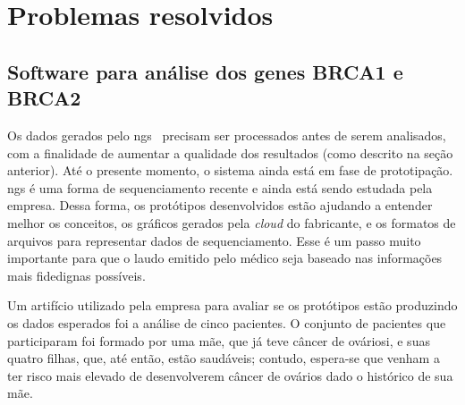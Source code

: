 
%
%


\section{Problemas resolvidos}

\subsection{Software para análise dos genes BRCA1 e BRCA2}

Os dados gerados pelo \gls{ngs}~\cite{SamTools} precisam ser processados antes de serem analisados, com a finalidade de aumentar a qualidade
dos resultados (como descrito na seção anterior).
Até o presente momento, o sistema ainda está em fase de prototipação. \gls{ngs} é uma forma de sequenciamento
recente e ainda está sendo estudada pela empresa. Dessa forma, os protótipos desenvolvidos estão ajudando a entender melhor os conceitos, os gráficos
gerados pela \textit{cloud} do fabricante, e os formatos de arquivos para representar dados de sequenciamento. Esse é um passo muito importante para que
o laudo emitido pelo médico seja baseado nas informações mais fidedignas possíveis.

Um artifício utilizado pela empresa para avaliar se os protótipos estão produzindo os dados esperados foi a análise de cinco pacientes.
O conjunto de pacientes que participaram foi formado por uma mãe, que já teve câncer de ováriosi, e suas quatro filhas, que, até então, estão saudáveis;
contudo, espera-se que venham a ter risco mais elevado de desenvolverem câncer de ovários dado o histórico de sua mãe.

